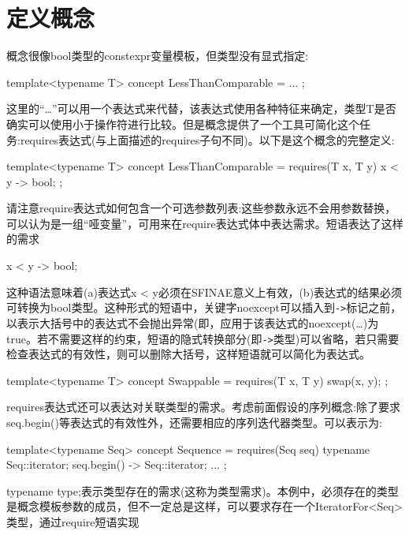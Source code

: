 \section{定义概念}
概念很像bool类型的constexpr变量模板，但类型没有显式指定:

\begin{cpp}
template<typename T> concept LessThanComparable = ... ;
\end{cpp}

这里的“…”可以用一个表达式来代替，该表达式使用各种特征来确定，类型T是否确实可以使用小于操作符进行比较。但是概念提供了一个工具可简化这个任务:requires表达式(与上面描述的requires子句不同)。以下是这个概念的完整定义:

\begin{cpp}
template<typename T>
concept LessThanComparable = requires(T x, T y) {
	{ x < y } -> bool;
};
\end{cpp}

请注意require表达式如何包含一个可选参数列表:这些参数永远不会用参数替换，可以认为是一组“哑变量”，可用来在require表达式体中表达需求。短语表达了这样的需求

\begin{cpp}
{ x < y } -> bool;
\end{cpp}

这种语法意味着(a)表达式x < y必须在SFINAE意义上有效，(b)表达式的结果必须可转换为bool类型。这种形式的短语中，关键字noexcept可以插入到\texttt{->}标记之前，以表示大括号中的表达式不会抛出异常(即，应用于该表达式的noexcept(…)为true。若不需要这样的约束，短语的隐式转换部分(即\texttt{->}类型)可以省略，若只需要检查表达式的有效性，则可以删除大括号，这样短语就可以简化为表达式。

\begin{cpp}
template<typename T>
concept Swappable = requires(T x, T y) {
	swap(x, y);
};
\end{cpp}

requires表达式还可以表达对关联类型的需求。考虑前面假设的序列概念:除了要求seq.begin()等表达式的有效性外，还需要相应的序列迭代器类型。可以表示为:

\begin{cpp}
template<typename Seq>
concept Sequence = requires(Seq seq) {
	typename Seq::iterator;
	{ seq.begin() } -> Seq::iterator;
	...
};
\end{cpp}

typename type;表示类型存在的需求(这称为类型需求)。本例中，必须存在的类型是概念模板参数的成员，但不一定总是这样，可以要求存在一个IteratorFor<Seq>类型，通过require短语实现

